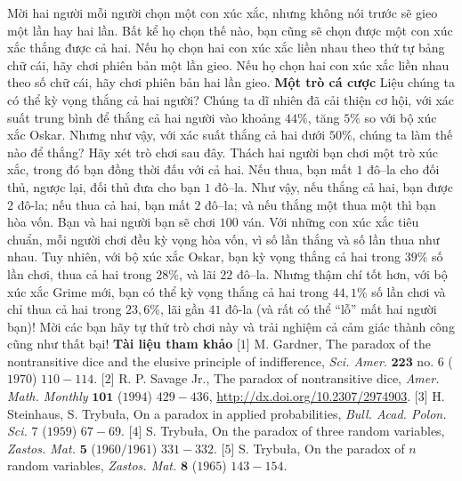 \begin{multicols}{2}
	\vskip 0.05cm
	Mời hai người mỗi người chọn một con xúc xắc, nhưng không nói trước sẽ gieo một lần hay hai lần. Bất kể họ chọn thế nào, bạn cũng sẽ chọn được một con xúc xắc thắng được cả hai. Nếu họ chọn hai con xúc xắc liền nhau theo thứ tự bảng chữ cái, hãy chơi phiên bản một lần gieo. Nếu họ chọn hai con xúc xắc liền nhau theo số chữ cái, hãy chơi phiên bản hai lần gieo. 
	\vskip 0.1cm
	\textbf{\color{quantoan}Một trò cá cược}
	\vskip 0.1cm
	Liệu chúng ta có thể kỳ vọng thắng cả hai người? Chúng ta dĩ nhiên đã cải thiện cơ hội, với xác suất trung bình để thắng cả hai người vào khoảng $44\%$, tăng $5\%$ so với bộ xúc xắc Oskar. Nhưng như vậy, với xác suất thắng cả hai dưới $50\%$, chúng ta làm thế nào để thắng? Hãy xét trò chơi sau đây.
	\vskip 0.1cm
	Thách hai người bạn chơi một trò xúc xắc, trong đó bạn đồng thời đấu với cả hai. Nếu thua, bạn mất $1$ đô--la cho đối thủ, ngược lại, đối thủ đưa cho bạn $1$ đô--la. Như vậy, nếu thắng cả hai, bạn được $2$ đô-la; nếu thua cả hai, bạn mất $2$ đô--la; và nếu thắng một thua một thì bạn hòa vốn. Bạn và hai người bạn sẽ chơi $100$ ván.
	\vskip 0.1cm
	Với những con xúc xắc tiêu chuẩn, mỗi người chơi đều kỳ vọng hòa vốn, vì số lần thắng và số lần thua như nhau.
	\vskip 0.1cm
	Tuy nhiên, với bộ xúc xắc Oskar, bạn kỳ vọng thắng cả hai trong $39\%$ số lần chơi, thua cả hai trong $28\%$, và lãi $22$ đô--la.
	\vskip 0.1cm
	Nhưng thậm chí tốt hơn, với bộ xúc xắc Grime mới, bạn có thể kỳ vọng thắng cả hai trong $44{,}1\%$ số lần chơi và chỉ thua cả hai trong $23{,}6\%$, lãi gần $41$ đô-la (và rất có thể “lỗ” mất hai người bạn)!
	\vskip 0.1cm
	Mời các bạn hãy tự thử trò chơi này và trải nghiệm cả cảm giác thành công cũng như thất bại!
	\vskip 0.1cm
	\textbf{\color{quantoan}Tài liệu tham khảo}
	\vskip 0.1cm
	[$1$] M. Gardner, The paradox of the nontransitive dice and the elusive principle of indifference, \textit{Sci. Amer}. $\pmb{223}$ no. $6$ ($1970$) $110-114$.
	\vskip 0.1cm
	[$2$] R. P. Savage Jr., The paradox of nontransitive dice, \textit{Amer. Math. Monthly} $\pmb{101}$ ($1994$) $429-436$, \url{http://dx.doi.org/10.2307/2974903}.
	\vskip 0.1cm 
	[$3$] H. Steinhaus, S. Trybuła, On a paradox in applied probabilities, \textit{Bull. Acad. Polon. Sci.} $7$ ($1959$) $67-69$.
	\vskip 0.1cm
	[$4$] S. Trybuła, On the paradox of three random variables, \textit{Zastos. Mat.} $\pmb{5}$ ($1960/1961$) $331-332$.
	\vskip 0.1cm
	[$5$] S. Trybuła, On the paradox of $n$ random variables, \textit{Zastos. Mat.} $\pmb{8}$ ($1965$) $143-154$.
\end{multicols}
\vspace*{-10pt}
